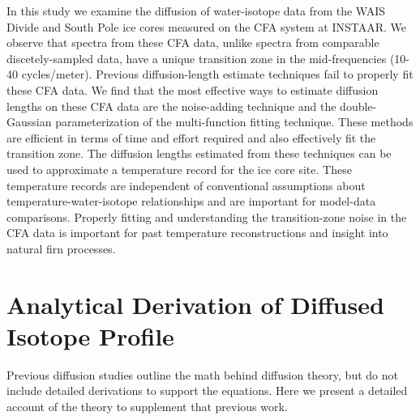 \documentclass[draft, jgrga]{AGUTeX}
\begin{document}
\begin{article}
In this study we examine the diffusion of water-isotope data from the WAIS Divide and South Pole ice cores measured on the CFA system at INSTAAR. We observe that spectra from these CFA data, unlike spectra from comparable discetely-sampled data, have a unique transition zone in the mid-frequencies (10-40 cycles/meter). Previous diffusion-length estimate techniques fail to properly fit these CFA data. We find that the most effective ways to estimate diffusion lengths on these CFA data are the noise-adding technique and the double-Gaussian parameterization of the multi-function fitting technique. These methods are efficient in terms of time and effort required and also effectively fit the transition zone. The diffusion lengths estimated from these techniques can be used to approximate a temperature record for the ice core site. These temperature records are independent of conventional assumptions about temperature-water-isotope relationships and are important for model-data comparisons. Properly fitting and understanding the transition-zone noise in the CFA data is important for past temperature reconstructions and insight into natural firn processes.





\appendix

\section{Analytical Derivation of Diffused Isotope Profile}

Previous diffusion studies outline the math behind diffusion theory, but do not include detailed derivations to support the equations. Here we present a detailed account of the theory to supplement that previous work.


\end{article}
\end{document}
